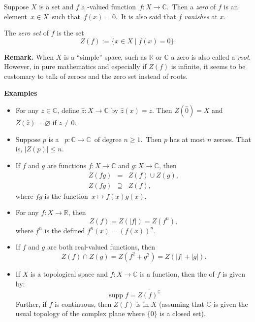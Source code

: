 \documentclass[12pt]{article}
\def\C{\mathbb{C}}
\def\R{\mathbb{R}}
\begin{document}

Suppose $X$ is a set and $f$ a -valued function\, $f\colon X\to \C$.\, Then a {\em zero} of $f$ is an element\, $x\in X$\, such that\, $f(x) = 0$.\, It is also said that $f$ {\em vanishes} at $x$.

The {\em zero set} of $f$ is the set
$$Z(f) := \{ x\in X \mid f(x)=0\}.$$

{\bf Remark.} When $X$ is a ``simple'' space, such as $\R$ or $\C$ a zero is also called a {\em root}.\, However, in pure mathematics and especially if $Z(f)$ is infinite, it seems to be customary to talk of zeroes and the zero set instead of roots. 

{\bf Examples}

\begin{itemize}
\item For any $z\in \C$, define $\hat{z}:X\to \C$ by $\hat{z}(x)=z$.  Then $Z(\hat{0})=X$ and $Z(\hat{z})=\varnothing$ if $z\ne 0$.
\item Suppose $p$ is a \, $p\colon\C\to\C$\, of degree $n\ge 1$.\, Then $p$ has at most $n$ zeroes. That is, $|Z(p)|\le n$. 
\item If $f$ and $g$ are functions $f\colon X\to\C$ and  $g\colon X\to\C$, then
\begin{eqnarray*}
Z(fg)&=&Z(f)\cup Z(g),\\
Z(fg)&\supseteq& Z(f),
\end{eqnarray*}
where $fg$ is the function\, $x\mapsto f(x) g(x)$.
\item For any $f\colon X\to \R$, then $$Z(f)=Z(|f|)=Z(f^n),$$ where $f^n$ is the defined $f^n(x)=(f(x))^n$.
\item If $f$ and $g$ are both real-valued functions, then
$$Z(f)\cap Z(g)=Z(f^2+g^2)=Z(|f|+|g|).$$
\item If $X$ is a topological space and $f:X\to \C$ is a function, then the  of $f$ is given by:
$$\operatorname{supp} f = \overline{Z(f)^\complement}$$
Further, if $f$ is continuous, then $Z(f)$ is  in $X$ (assuming that $\C$ is given the usual topology of the complex plane where
$\{0\}$ is a closed set).
\end{itemize}
\end{document}
